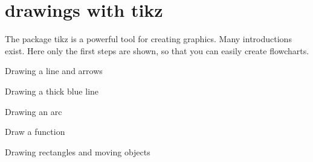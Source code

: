 
%
%

\chapter{drawings with tikz}


The package tikz is a powerful tool for creating graphics. Many introductions exist. Here only the first steps are shown, so that you can easily create flowcharts.

\bigskip

Drawing a line and arrows



\medskip



\bigskip

Drawing a thick blue line



\medskip



\bigskip

Drawing an arc



\medskip



\bigskip

Draw a function



\medskip



\bigskip

Drawing rectangles and moving objects



\medskip



\bigskip


\bigskip

